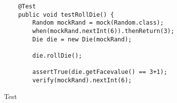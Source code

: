 \begin{figure}
	\caption{Test }
	\label{TestRollDie}
	\begin{lstlisting}
	@Test
	public void testRollDie() {
		Random mockRand = mock(Random.class);
		when(mockRand.nextInt(6)).thenReturn(3);
		Die die = new Die(mockRand); 
		
		die.rollDie();
		
		assertTrue(die.getFacevalue() == 3+1);
		verify(mockRand).nextInt(6); 
    \end{lstlisting}
\end{figure}     
